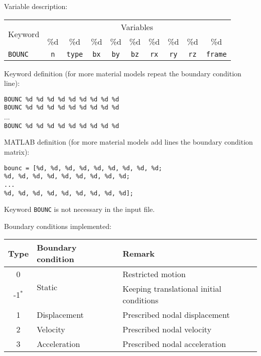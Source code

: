 Variable description:

\begin{tabular}{|l|c|c|c|c|c|c|c|c|c|}
\hline
\multirow{2}{*}{Keyword} & \multicolumn{9}{c|}{Variables} \\ \cline{2-10}
& \%d & \%d & \%d & \%d & \%d & \%d & \%d & \%d & \%d \\ \hline
\texttt{BOUNC} & \texttt{n} & \texttt{type} & \texttt{bx} & \texttt{by} & \texttt{bz} & \texttt{rx} & \texttt{ry} & \texttt{rz} & \texttt{frame} \\ \hline
\end{tabular}

Keyword definition (for more material models repeat the boundary condition line):

\begin{tcolorbox}
\texttt{BOUNC \%d \%d \%d \%d \%d \%d \%d \%d \%d} \\
\texttt{BOUNC \%d \%d \%d \%d \%d \%d \%d \%d \%d} \\
... \\
\texttt{BOUNC \%d \%d \%d \%d \%d \%d \%d \%d \%d}
\end{tcolorbox}

MATLAB definition (for more material models add lines the boundary condition matrix):

\begin{tcolorbox}
\texttt{bounc = [\%d, \%d, \%d, \%d, \%d, \%d, \%d, \%d, \%d; \\
\%d, \%d, \%d, \%d, \%d, \%d, \%d, \%d, \%d; \\
... \\
\%d, \%d, \%d, \%d, \%d, \%d, \%d, \%d, \%d];}
\end{tcolorbox}

Keyword \texttt{BOUNC} is not necessary in the input file.

Boundary conditions implemented:

\begin{tabular}{|c|l|l|}
\hline
{\bf Type} & {\bf Boundary condition} & {\bf Remark} \\ \hline
0 & \multirow{2}{*}{Static} & Restricted motion \\ \cline{1-1}\cline{3-3}
-1$^*$ & & Keeping translational initial conditions \\ \hline
1 & Displacement & Prescribed nodal displacement \\ \hline
2 & Velocity & Prescribed nodal velocity \\ \hline
3 & Acceleration & Prescribed nodal acceleration \\ \hline
\end{tabular}

